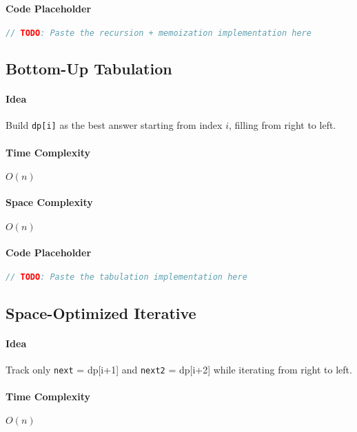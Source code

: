 \documentclass[11pt,a4paper]{article}
\begin{document}
\paragraph{Code Placeholder}
\begin{lstlisting}[language=C++, caption={q1: Top-Down with Memoization}, label={lst:q1-topdown}]
// TODO: Paste the recursion + memoization implementation here
\end{lstlisting}

\subsection{Bottom-Up Tabulation}
\paragraph{Idea} Build \texttt{dp[i]} as the best answer starting from index \(i\), filling from right to left.

\paragraph{Time Complexity} \(O(n)\)

\paragraph{Space Complexity} \(O(n)\)

\paragraph{Code Placeholder}
\begin{lstlisting}[language=C++, caption={q1: Bottom-Up Tabulation}, label={lst:q1-tab}]
// TODO: Paste the tabulation implementation here
\end{lstlisting}

\subsection{Space-Optimized Iterative}
\paragraph{Idea} Track only \texttt{next} = dp[i+1] and \texttt{next2} = dp[i+2] while iterating from right to left.

\paragraph{Time Complexity} \(O(n)\)
\end{document}
